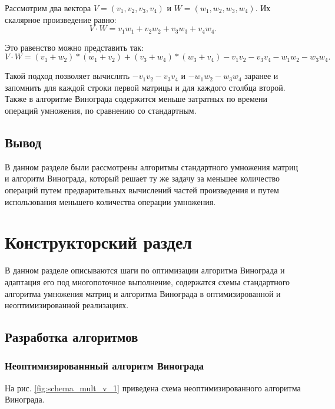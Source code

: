 \documentclass[a4paper,14pt]{article}
\begin{document}
	Рассмотрим два вектора $V = (v_1, v_2, v_3, v_4)$ и $W = (w_1, w_2, w_3, w_4)$. Их скалярное произведение равно:
	\[
	 V \cdot W = v_1w_1 + v_2w_2 + v_3w_3 + v_4w_4.
	\]
	
	Это равенство можно представить так:
	\[
	 V \cdot W = (v_1 + w_2) * (w_1 + v_2) + (v_3 + w_4)*(w_3 + v_4) - v_1v_2 - v_3v_4 - w_1w_2 - w_3w_4.
	 \]	 
	 
	Такой подход позволяет вычислять $ - v_1v_2 - v_3v_4$ и $ - w_1w_2 - w_3w_4$ заранее и запомнить для каждой строки первой матрицы и для каждого столбца второй. Также в алгоритме Винограда содержится меньше затратных по времени операций умножения, по сравнению со стандартным\cite{makkonell}.
	

	    
		\subsection*{Вывод}
		В данном разделе были рассмотрены алгоритмы стандартного умножения матриц и алгоритм Винограда, который решает ту же задачу за меньшее количество операций путем предварительных вычислений частей произведения и путем использования меньшего количества операции умножения. 


\pagebreak


\section{Конструкторский раздел}
	В данном разделе описываются шаги по оптимизации алгоритма Винограда и адаптация его под многопоточное выполнение, содержатся схемы стандартного алгоритма умножения матриц и алгоритма Винограда в оптимизированной и неоптимизированной реализациях.
	
        
    \subsection{Разработка алгоритмов}
    \subsubsection{Неоптимизированнный алгоритм Винограда}
    
        На рис. \ref{fig:schema_mult_v_1} приведена схема неоптимизированного алгоритма Винограда.
        
        
        
\end{document}
